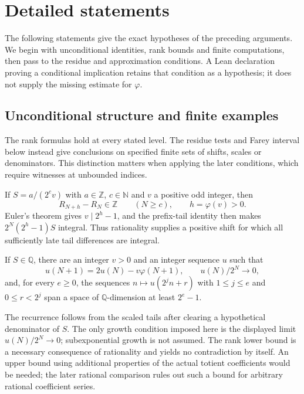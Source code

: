 \section{Detailed statements}

The following statements give the exact hypotheses of the preceding
arguments. We begin with unconditional identities, rank bounds and
finite computations, then pass to the residue and approximation
conditions. A Lean declaration proving a conditional implication
retains that condition as a hypothesis; it does not supply the
missing estimate for $\varphi$.

\subsection{Unconditional structure and finite examples}

The rank formulas hold at every stated level. The residue tests and
Farey interval below instead give conclusions on specified finite
sets of shifts, scales or denominators. This distinction matters when
applying the later conditions, which require witnesses at unbounded
indices.

\begin{thm}\label{catalogue:cert:a9}
If $S=a/(2^cv)$ with $a\in\mathbb Z$, $c\in\mathbb N$ and $v$ a
positive odd integer, then
\[
 R_{N+h}-R_N\in\mathbb Z\qquad(N\ge c),\qquad h=\varphi(v)>0.
\]
Euler's theorem gives $v\mid2^h-1$, and the prefix-tail identity then
makes $2^N(2^h-1)S$ integral. Thus rationality supplies a positive
shift for which all sufficiently late tail differences are integral.
\end{thm}

\begin{thm}\label{catalogue:cert:d5}
If $S\in\mathbb Q$, there are an integer $v>0$ and an integer sequence
$u$ such that
\[
 u(N+1)=2u(N)-v\varphi(N+1),\qquad u(N)/2^N\longrightarrow0,
\]
and, for every $e\ge0$, the sequences
$ n\mapsto u(2^jn+r)$ with $1\le j\le e$ and $0\le r<2^j$
span a space of $\mathbb Q$-dimension at least $2^e-1$.

The recurrence follows from the scaled tails after clearing a
hypothetical denominator of $S$. The only growth condition imposed
here is the displayed limit $u(N)/2^N\to0$; subexponential growth is
not assumed. The rank lower bound is a necessary consequence of
rationality and yields no contradiction by itself. An upper
bound using additional properties of the actual totient coefficients
would be needed; the later rational comparison rules out such a bound
for arbitrary rational coefficient series.
\end{thm}

